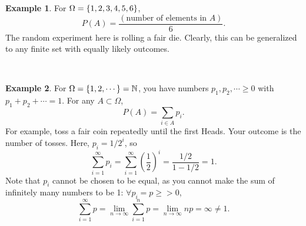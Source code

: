 \documentclass[12pt,a4paper]{article}
\theoremstyle{definition}
\newtheorem{example}{Example}[section]
\theoremstyle{definition}
\theoremstyle{definition}
\theoremstyle{definition}
\theoremstyle{remark}
\theoremstyle{definition}
\begin{document}
\newpage
\begin{example}
	For $\Omega=\set{1,2,3,4,5,6}$, \[
	P(A)=\frac{(\text{number of elements in $A$})}{6}.
	\] The random experiment here is rolling a fair die. Clearly, this can be generalized to any finite set with equally likely outcomes.
\end{example}\
\\
\begin{example}
	For $\Omega=\set{1,2,\cdots}=\mathbb{N}$, you have numbers $p_1,p_2,\cdots\geq0$ with $p_1+p_2+\cdots=1$. For any $A\subset\Omega$, \[
	P(A)=\sum_{i\in A}p_i.
	\] For example, toss a fair coin repeatedly until the first Heads. Your outcome is the number of tosses. Here, $p_i=1/2^i$, so \[
	\sum_{i=1}^\infty p_i=\sum_{i=1}^\infty\left(\frac{1}{2}\right)^i=\frac{1/2}{1-1/2}=1.
	\] Note that $p_i$ cannot be chosen to be equal, as you cannot make the sum of infinitely many numbers to be 1: $\forall p_i=p\geq>0$, \[
	\sum_{i=1}^{\infty}p=\lim\limits_{n\to\infty}\sum_{i=1}^np=\lim\limits_{n\to\infty}np=\infty\neq1.
	\]
\end{example}\
\\
\end{document}
